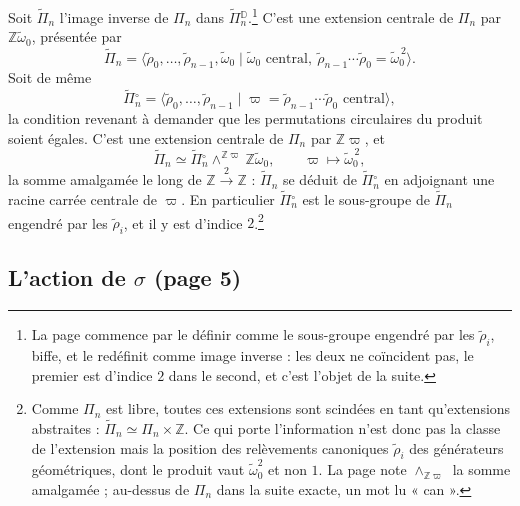 \documentclass[11pt,a4paper]{article}
\begin{document}
Soit $\widetilde{\Pi}_n$ l'image inverse de $\Pi_n$ dans
$\widetilde{\Pi}{}^{\mathbb{D}}_n$.\footnote{La page commence par le définir comme
le sous-groupe engendré par les $\tilde\rho_i$, biffe, et le redéfinit comme image
inverse : les deux ne coïncident pas, le premier est d'indice $2$ dans le second,
et c'est l'objet de la suite.} C'est une extension centrale de $\Pi_n$ par
$\mathbb{Z}\tilde\omega_0$, présentée par
\[
\widetilde{\Pi}_n = \langle \tilde\rho_0, \dots, \tilde\rho_{n-1}, \tilde\omega_0
\mid \tilde\omega_0 \text{ central},\
\tilde\rho_{n-1}\cdots\tilde\rho_0 = \tilde\omega_0^{\,2} \rangle .
\]
Soit de même
\[
\widetilde{\Pi}{}^{\circ}_n = \langle \tilde\rho_0, \dots, \tilde\rho_{n-1} \mid
\varpi = \tilde\rho_{n-1}\cdots\tilde\rho_0 \text{ central} \rangle ,
\]
la condition revenant à demander que les permutations circulaires du produit
soient égales. C'est une extension centrale de $\Pi_n$ par $\mathbb{Z}\varpi$, et
\[
\widetilde{\Pi}_n \simeq \widetilde{\Pi}{}^{\circ}_n \wedge^{\mathbb{Z}\varpi}
\mathbb{Z}\tilde\omega_0, \qquad \varpi \longmapsto \tilde\omega_0^{\,2} ,
\]
la somme amalgamée le long de $\mathbb{Z} \xrightarrow{2} \mathbb{Z}$ :
$\widetilde{\Pi}_n$ se déduit de $\widetilde{\Pi}{}^{\circ}_n$ en adjoignant une
racine carrée centrale de $\varpi$. En particulier $\widetilde{\Pi}{}^{\circ}_n$ est
le sous-groupe de $\widetilde{\Pi}_n$ engendré par les $\tilde\rho_i$, et il y est
d'indice $2$.\footnote{Comme $\Pi_n$ est libre, toutes ces extensions sont
scindées en tant qu'extensions abstraites : $\widetilde{\Pi}_n \simeq \Pi_n \times
\mathbb{Z}$. Ce qui porte l'information n'est donc pas la classe de l'extension
mais la position des relèvements canoniques $\tilde\rho_i$ des générateurs
géométriques, dont le produit vaut $\tilde\omega_0^2$ et non $1$. La page note
$\wedge_{\mathbb{Z}\varpi}$ la somme amalgamée ; au-dessus de $\Pi_n$ dans la
suite exacte, un mot lu « can ».}

\subsection*{L'action de $\sigma$ (page 5)}
\end{document}
